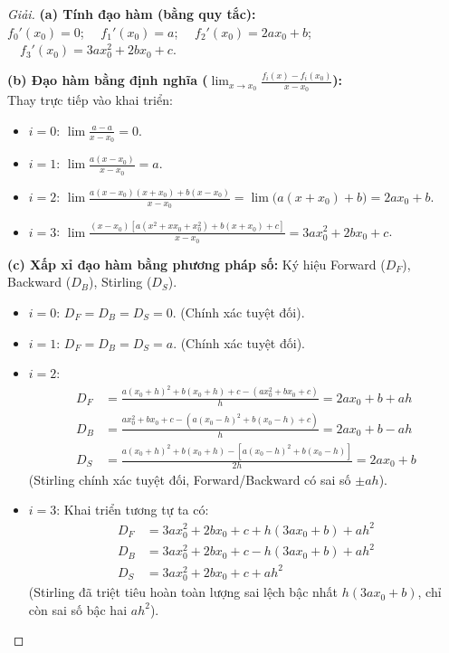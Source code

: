\documentclass{article}
\begin{document}
\begin{proof}[Giải]
	\textbf{(a) Tính đạo hàm (bằng quy tắc):}\\
	$f_0'(x_0) = 0$; $\quad f_1'(x_0) = a$; $\quad f_2'(x_0) = 2ax_0 + b$; $\quad f_3'(x_0) = 3ax_0^2 + 2bx_0 + c$.
	
	\textbf{(b) Đạo hàm bằng định nghĩa ($\lim_{x \to x_0} \frac{f_i(x) - f_i(x_0)}{x - x_0}$):}\\
	Thay trực tiếp vào khai triển:
	\begin{itemize}
		\item $i=0$: $\lim \frac{a - a}{x - x_0} = 0$.
		\item $i=1$: $\lim \frac{a(x - x_0)}{x - x_0} = a$.
		\item $i=2$: $\lim \frac{a(x-x_0)(x+x_0) + b(x-x_0)}{x - x_0} = \lim \big(a(x+x_0)+b\big) = 2ax_0 + b$.
		\item $i=3$: $\lim \frac{(x-x_0)[a(x^2+xx_0+x_0^2) + b(x+x_0) + c]}{x - x_0} = 3ax_0^2 + 2bx_0 + c$.
	\end{itemize}
	
	\textbf{(c) Xấp xỉ đạo hàm bằng phương pháp số:}
	Ký hiệu Forward ($D_F$), Backward ($D_B$), Stirling ($D_S$).
	\begin{itemize}
		\item $i=0$: $D_F = D_B = D_S = 0$. (Chính xác tuyệt đối).
		\item $i=1$: $D_F = D_B = D_S = a$. (Chính xác tuyệt đối).
		\item $i=2$: 
		\begin{align*}
			D_F &= \frac{a(x_0+h)^2+b(x_0+h)+c - (ax_0^2+bx_0+c)}{h} = 2ax_0 + b + ah \\
			D_B &= \frac{ax_0^2+bx_0+c - (a(x_0-h)^2+b(x_0-h)+c)}{h} = 2ax_0 + b - ah \\
			D_S &= \frac{a(x_0+h)^2+b(x_0+h) - [a(x_0-h)^2+b(x_0-h)]}{2h} = 2ax_0 + b
		\end{align*}
		(Stirling chính xác tuyệt đối, Forward/Backward có sai số $\pm ah$).
		\item $i=3$: Khai triển tương tự ta có:
		\begin{align*}
			D_F &= 3ax_0^2 + 2bx_0 + c + h(3ax_0 + b) + ah^2 \\
			D_B &= 3ax_0^2 + 2bx_0 + c - h(3ax_0 + b) + ah^2 \\
			D_S &= 3ax_0^2 + 2bx_0 + c + ah^2
		\end{align*}
		(Stirling đã triệt tiêu hoàn toàn lượng sai lệch bậc nhất $h(3ax_0+b)$, chỉ còn sai số bậc hai $ah^2$).
	\end{itemize}
\end{proof}
\end{document}
